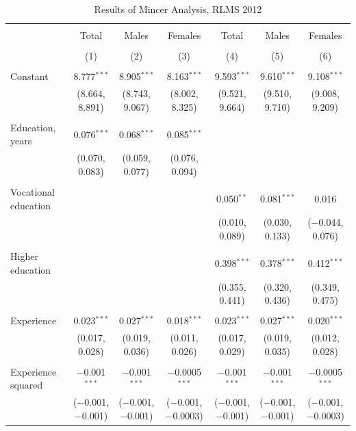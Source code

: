 \documentclass[12pt,a4paper]{article}
\numberwithin{equation}{section}
\begin{document}
\begin{landscape}
	
	\fontsize{9}{11}
	\selectfont
	
	\begin{table}[!htbp] \centering 
		\caption{Results of Mincer Analysis, RLMS 2012} 
		\label{} 
		\begin{tabular}{@{\extracolsep{5pt}}lcccccc} 
			\\[-1.8ex]\hline 
			\hline \\[-1.8ex] 
			& Total & Males & Females & Total & Males & Females \\ 
			\\[-1.8ex] & (1) & (2) & (3) & (4) & (5) & (6)\\ 
			\hline \\[-1.8ex] 
			Constant & 8.777$^{***}$ & 8.905$^{***}$ & 8.163$^{***}$ & 9.593$^{***}$ & 9.610$^{***}$ & 9.108$^{***}$ \\ 
			& (8.664, 8.891) & (8.743, 9.067) & (8.002, 8.325) & (9.521, 9.664) & (9.510, 9.710) & (9.008, 9.209) \\ 
			& & & & & & \\ 
			Education, years & 0.076$^{***}$ & 0.068$^{***}$ & 0.085$^{***}$ &  &  &  \\ 
			& (0.070, 0.083) & (0.059, 0.077) & (0.076, 0.094) &  &  &  \\ 
			& & & & & & \\ 
			Vocational education &  &  &  & 0.050$^{**}$ & 0.081$^{***}$ & 0.016 \\ 
			&  &  &  & (0.010, 0.089) & (0.030, 0.133) & ($-$0.044, 0.076) \\ 
			& & & & & & \\ 
			Higher education &  &  &  & 0.398$^{***}$ & 0.378$^{***}$ & 0.412$^{***}$ \\ 
			&  &  &  & (0.355, 0.441) & (0.320, 0.436) & (0.349, 0.475) \\ 
			& & & & & & \\ 
			Experience & 0.023$^{***}$ & 0.027$^{***}$ & 0.018$^{***}$ & 0.023$^{***}$ & 0.027$^{***}$ & 0.020$^{***}$ \\ 
			& (0.017, 0.028) & (0.019, 0.036) & (0.011, 0.026) & (0.017, 0.029) & (0.019, 0.035) & (0.012, 0.028) \\ 
			& & & & & & \\ 
			Experience squared & $-$0.001$^{***}$ & $-$0.001$^{***}$ & $-$0.0005$^{***}$ & $-$0.001$^{***}$ & $-$0.001$^{***}$ & $-$0.0005$^{***}$ \\ 
			& ($-$0.001, $-$0.001) & ($-$0.001, $-$0.001) & ($-$0.001, $-$0.0003) & ($-$0.001, $-$0.001) & ($-$0.001, $-$0.001) & ($-$0.001, $-$0.0003) \\ 

\end{tabular}
\end{table}
\end{landscape}
\end{document}
